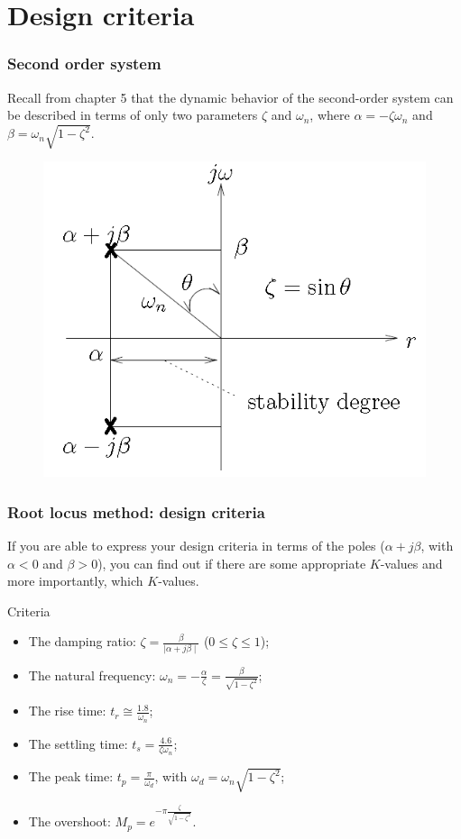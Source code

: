 \section{Design criteria}

\begin{frame}
\frametitle{Second order system}
\justify
	Recall from chapter 5 that the dynamic behavior of the second-order system can be described in terms of only two parameters $\zeta$ and $\omega_n$, where $\alpha = -\zeta \omega_n$ and $\beta = \omega_n \sqrt{1 - \zeta^2} $.
	\begin{figure}
		\centering
		\includegraphics[width=0.5\linewidth]{poles_system}
	\end{figure}
\end{frame}

\begin{frame}
\frametitle{Root locus method: design criteria}
\justify
	If you are able to express your design criteria in terms of the poles ($\alpha + j\beta$, with $\alpha < 0$ and $\beta>0$), you can find out if there are some appropriate $K$-values and more importantly, which $K$-values.\\
	\begin{block}{Criteria}
	\begin{itemize}
		\item The damping ratio: $\zeta = \frac{\beta}{\mid \alpha + j\beta\mid}$ ($0 \leq \zeta \leq 1$);
		\item The natural frequency: $\omega_n = -\frac{\alpha}{\zeta} = \frac{\beta}{\sqrt{1 - \zeta^2}}$;
		\item The rise time: $t_r \cong \frac{1.8}{\omega_n}$;
		\item The settling time: $t_s = \frac{4.6}{\zeta \omega_n}$;
		\item The peak time: $t_p =\frac{\pi}{\omega_d}$, with $\omega_d = \omega_n \sqrt{1 - \zeta^2} $;
		\item The overshoot: $M_p = e^{-\pi \frac{\zeta}{\sqrt{1 - \zeta^2}}}$.
	\end{itemize}
	\end{block}
\end{frame}

